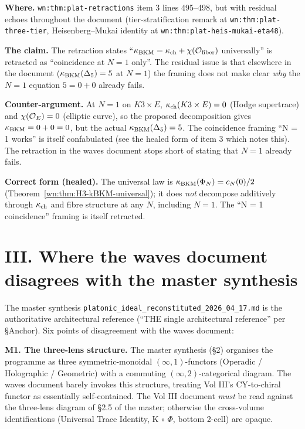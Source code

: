 \textbf{Where.} \verb|wn:thm:plat-retractions| item 3 lines 495--498,
but with residual echoes throughout the document (tier-stratification
remark at \verb|wn:thm:plat-three-tier|, Heisenberg--Mukai identity
at \verb|wn:thm:plat-heis-mukai-eta48|).

\textbf{The claim.} The retraction states ``$\kappa_{\mathrm{BKM}} = \kappa_{\mathrm{ch}} +
\chi(\mathcal{O}_{\mathrm{fiber}})$ universally'' is retracted as ``coincidence
at $N = 1$ only''. The residual issue is that elsewhere in the
document ($\kappa_{\mathrm{BKM}}(\Delta_5) = 5$ at $N = 1$) the framing does not
make clear \emph{why} the $N = 1$ equation $5 = 0 + 0$ already fails.

\textbf{Counter-argument.} At $N = 1$ on $K3 \times E$,
$\kappa_{\mathrm{ch}}(K3 \times E) = 0$ (Hodge supertrace) and
$\chi(\mathcal{O}_E) = 0$ (elliptic curve), so the proposed
decomposition gives $\kappa_{\mathrm{BKM}} = 0 + 0 = 0$, but the actual
$\kappa_{\mathrm{BKM}}(\Delta_5) = 5$. The coincidence framing ``N = 1 works'' is
itself confabulated (see the healed form of item 3 which notes this).
The retraction in the waves document stops short of stating that
$N = 1$ already fails.

\textbf{Correct form (healed).} The universal law is
$\kappa_{\mathrm{BKM}}(\Phi_N) = c_N(0)/2$ (Theorem~\ref{wn:thm:H3-kBKM-universal});
it does \emph{not} decompose additively through $\kappa_{\mathrm{ch}}$ and fibre
structure at any $N$, including $N = 1$. The ``N = 1 coincidence''
framing is itself retracted.

\section{III. Where the waves document disagrees with the master
synthesis}
\label{wn:sec:wave17-agent15-master-consistency}

The master synthesis \verb|platonic_ideal_reconstituted_2026_04_17.md|
is the authoritative architectural reference (``THE single
architectural reference'' per \S Anchor). Six points of disagreement
with the waves document:

\textbf{M1. The three-lens structure.} The master synthesis (\S2)
organises the programme as three symmetric-monoidal
$(\infty, 1)$-functors (Operadic / Holographic / Geometric) with a
commuting $(\infty, 2)$-categorical diagram. The waves document
barely invokes this structure, treating Vol III's CY-to-chiral functor
as essentially self-contained. The Vol III document \emph{must} be
read against the three-lens diagram of \S2.5 of the master; otherwise
the cross-volume identifications (Universal Trace Identity, K $\circ$ $\Phi$,
bottom 2-cell) are opaque.

